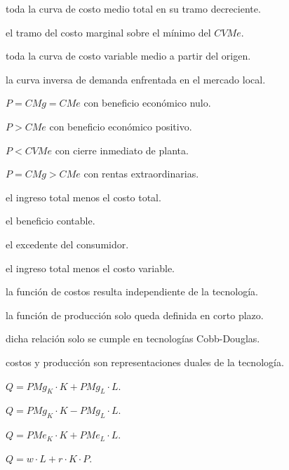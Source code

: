 \begin{opts}
    \item toda la curva de costo medio total en su tramo decreciente.
    \item el tramo del costo marginal sobre el mínimo del $CVMe$.
    \item toda la curva de costo variable medio a partir del origen.
    \item la curva inversa de demanda enfrentada en el mercado local.
\end{opts}

\begin{opts}
    \item $P=CMg=CMe$ con beneficio económico nulo.
    \item $P>CMe$ con beneficio económico positivo.
    \item $P<CVMe$ con cierre inmediato de planta.
    \item $P=CMg>CMe$ con rentas extraordinarias.
\end{opts}

\begin{opts}
    \item el ingreso total menos el costo total.
    \item el beneficio contable.
    \item el excedente del consumidor.
    \item el ingreso total menos el costo variable.
\end{opts}

\begin{opts}
    \item la función de costos resulta independiente de la tecnología.
    \item la función de producción solo queda definida en corto plazo.
    \item dicha relación solo se cumple en tecnologías Cobb-Douglas.
    \item costos y producción son representaciones duales de la tecnología.
\end{opts}

\begin{opts}
    \item $Q=PMg_K\cdot K+PMg_L\cdot L$.
    \item $Q=PMg_K\cdot K-PMg_L\cdot L$.
    \item $Q=PMe_K\cdot K+PMe_L\cdot L$.
    \item $Q=w\cdot L+r\cdot K\cdot P$.
\end{opts}

